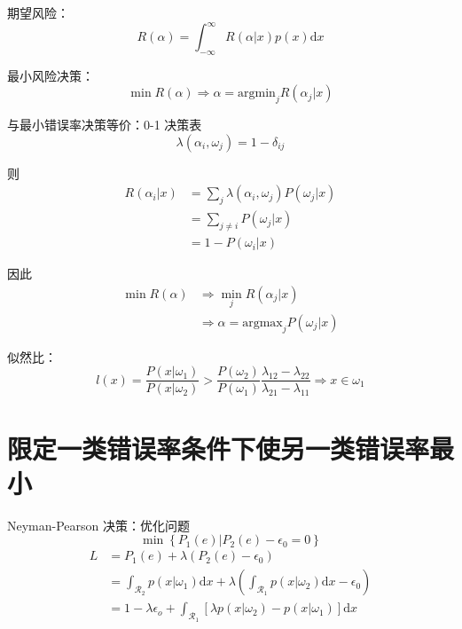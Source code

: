 \documentclass[openany]{ctexbook}
\theoremstyle{kaiti}
\theoremstyle{normal}
\begin{document}
期望风险：
\begin{equation}
R\left(\alpha \right)=\int_{-\infty}^{\infty}{R\left(\alpha |x \right)p(x)}\mathrm{d}x
\end{equation}

最小风险决策：
\begin{equation}
\min R\left(\alpha \right)\Rightarrow \alpha =\mathrm{argmin}_jR\left(\alpha_j|x \right)
\end{equation}

与最小错误率决策等价：0-1 决策表
\begin{equation}
\lambda \left(\alpha_i,\omega_j \right)=1-\delta_{ij}
\end{equation}

则
\begin{equation}
\begin{aligned}
  R\left(\alpha_i|x \right)
  &=\sum_j\lambda \left(\alpha_i,\omega_j \right)P\left(\omega_j|x \right)\\
  &=\sum_{j\ne i}P\left(\omega_j|x \right)\\
  &=1-P\left(\omega_i|x \right)
\end{aligned}
\end{equation}

因此
\begin{equation}
\begin{aligned}
  \min R\left(\alpha \right)
  &\Rightarrow \min_jR\left(\alpha_j|x \right)\\
  &\Rightarrow \alpha =\mathrm{argmax}_jP\left(\omega_j|x \right)
\end{aligned}
\end{equation}

似然比：
\begin{equation}
l(x)=\frac{P\left(x|\omega_1 \right)}{P\left(x|\omega_2 \right)}>\frac{P\left(\omega_2 \right)}{P\left(\omega_1 \right)}\frac{\lambda_{12}-\lambda_{22}}{\lambda_{21}-\lambda_{11}}\Rightarrow x\in \omega_1
\end{equation}

\section{限定一类错误率条件下使另一类错误率最小}

Neyman-Pearson 决策：优化问题
\begin{equation}
\min \left\{ P_1\left(e \right)|P_2\left(e \right)-\epsilon_0=0 \right\}
\end{equation}
\begin{equation}
\begin{aligned}
  L
  &=P_1\left(e \right)+\lambda \left(P_2\left(e \right)-\epsilon_0 \right)\\
  &=\int_{\mathcal{R}_2}{p\left(x|\omega_1 \right)}\mathrm{d}x+\lambda \left(\int_{\mathcal{R}_1}{p\left(x|\omega_2 \right)}\mathrm{d}x-\epsilon_0 \right)\\
  &=1-\lambda \epsilon_o+\int_{\mathcal{R}_1}{\left[\lambda p\left(x|\omega_2 \right)-p\left(x|\omega_1 \right)\right]}\mathrm{d}x
\end{aligned}
\end{equation}
\end{document}
